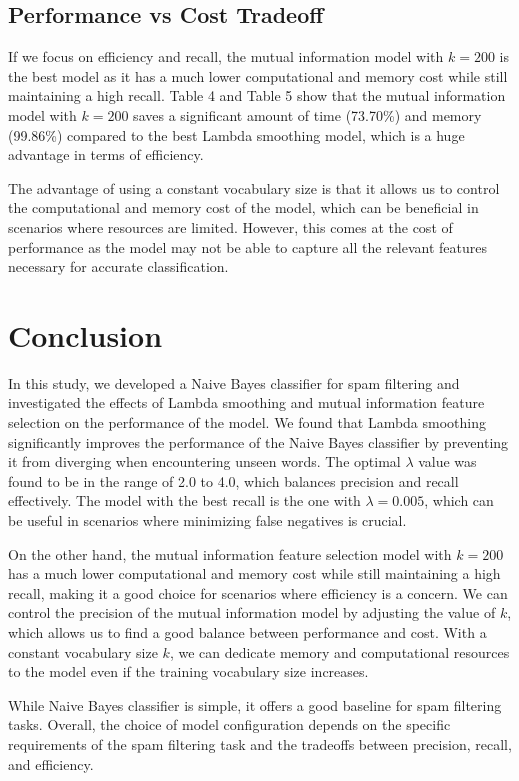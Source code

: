 \documentclass{acm_proc_article-sp}
\begin{document}
\subsection{Performance vs Cost Tradeoff}

If we focus on efficiency and recall, the mutual information model with $k = 200$ is the best model as it has a much lower computational and memory cost while still maintaining a high recall. Table 4 and Table 5 show that the mutual information model with $k = 200$ saves a significant amount of time (73.70\%) and memory (99.86\%) compared to the best Lambda smoothing model, which is a huge advantage in terms of efficiency. 

The advantage of using a constant vocabulary size is that it allows us to control the computational and memory cost of the model, which can be beneficial in scenarios where resources are limited. However, this comes at the cost of performance as the model may not be able to capture all the relevant features necessary for accurate classification.


\section{Conclusion}
In this study, we developed a Naive Bayes classifier for spam filtering and investigated the effects of Lambda smoothing and mutual information feature selection on the performance of the model. We found that Lambda smoothing significantly improves the performance of the Naive Bayes classifier by preventing it from diverging when encountering unseen words. The optimal $\lambda$ value was found to be in the range of 2.0 to 4.0, which balances precision and recall effectively. The model with the best recall is the one with $\lambda = 0.005$, which can be useful in scenarios where minimizing false negatives is crucial. 

On the other hand, the mutual information feature selection model with $k = 200$ has a much lower computational and memory cost while still maintaining a high recall, making it a good choice for scenarios where efficiency is a concern. We can control the precision of the mutual information model by adjusting the value of $k$, which allows us to find a good balance between performance and cost. With a constant vocabulary size $k$, we can dedicate memory and computational resources to the model even if the training vocabulary size increases. 

While Naive Bayes classifier is simple, it offers a good baseline for spam filtering tasks. Overall, the choice of model configuration depends on the specific requirements of the spam filtering task and the tradeoffs between precision, recall, and efficiency.
\end{document}
